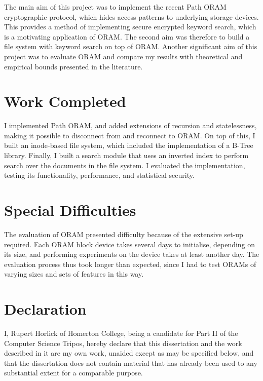\documentclass[12pt,a4paper,twoside,openright]{report}
\begin{document}

The main aim of this project was to implement the recent Path ORAM cryptographic protocol, which hides access patterns to underlying storage devices. This provides a method of implementing secure encrypted keyword search, which is a motivating application of ORAM. The second aim was therefore to build a file system with keyword search on top of ORAM. Another significant aim of this project was to evaluate ORAM and compare my results with theoretical and empirical bounds presented in the literature.

\section*{Work Completed}

I implemented Path ORAM, and added extensions of recursion and statelessness, making it possible to disconnect from and reconnect to ORAM. On top of this, I built an inode-based file system, which included the implementation of a B-Tree library. Finally, I built a search module that uses an inverted index to perform search over the documents in the file system. I evaluated the implementation, testing its functionality, performance, and statistical security.

\section*{Special Difficulties}

The evaluation of ORAM presented difficulty because of the extensive set-up required. Each ORAM block device takes several days to initialise, depending on its size, and performing experiments on the device takes at least another day. The evaluation process thus took longer than expected, since I had to test ORAMs of varying sizes and sets of features in this way.

\newpage
\section*{Declaration}

I, Rupert Horlick of Homerton College, being a candidate for Part II of the Computer
Science Tripos, hereby declare
that this dissertation and the work described in it are my own work,
unaided except as may be specified below, and that the dissertation
does not contain material that has already been used to any substantial
extent for a comparable purpose.
\end{document}
